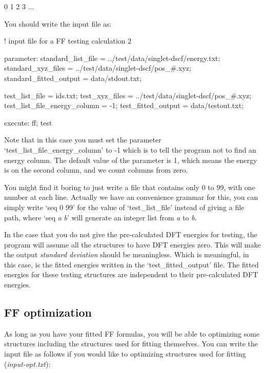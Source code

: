 \documentclass[11pt]{book}
\begin{document}
\begin{everbatim}
0
1
2
3
...
\end{everbatim}

You should write the input file as:

\begin{everbatim}

! input file for a FF testing calculation 2

{ parameter: 
   standard_list_file     = ../test/data/singlet-dscf/energy.txt;
   standard_xyz_files     = ../test/data/singlet-dscf/pos_#.xyz;
   standard_fitted_output = data/stdout.txt;
   
   test_list_file         = ids.txt;
   test_xyz_files         = ../test/data/singlet-dscf/pos_#.xyz;
   test_list_file_energy_column  = -1;
   test_fitted_output     = data/testout.txt;
}
{ execute: ff; test }

\end{everbatim}

Note that in this case you must set the parameter `test\_list\_file\_energy\_column' to -1 which is to tell 
the program not to find an energy column. The default value of the parameter is 1, which means the energy is 
on the second column, and we count columns from zero.

You might find it boring to just write a file that contains only 0 to 99, with one number at each line. 
Actually we have an convenience grammar for this, you can simply write `seq 0 99' for the value of 
`test\_list\_file' instead of giving a file path, where `seq \emph{a} \emph{b}' will generate an integer 
list from \emph{a} to \emph{b}.

In the case that you do not give the pre-calculated DFT energies for testing, the program will assume all 
the structures to have DFT energies zero. This will make the output \emph{standard deviation} should be meaningless. 
Which is meaningful, in this case, is the fitted energies written in the `test\_fitted\_output' file. 
The fitted energies for these testing structures are independent to their pre-calculated DFT energies.

\subsection{FF optimization}

As long as you have your fitted FF formulas, you will be able to optimizing some structures including the 
structures used for fitting themselves. You can write the input file as follows if you would like to 
optimizing structures used for fitting (\emph{input-opt.txt}):
\end{document}
